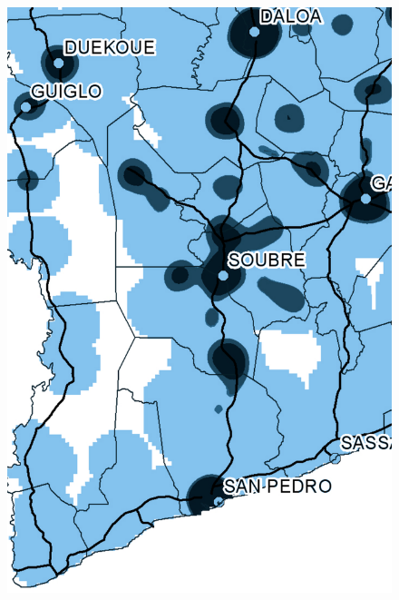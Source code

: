 \begin{figure}[h!]
{    \includegraphics[scale = 0.1]{results/images/kernel/19_detail_p2.pdf}
	\label{fig:subfig2_detail}
}
\subfigure[Monday, 20:00]{
}
\end{figure}
